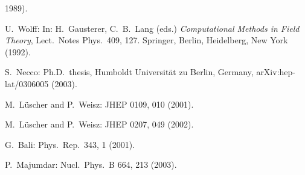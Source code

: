 \begin{enumerate}[label={[\arabic*]}]
        1989).
  \item U.~Wolff: In: H.~Gausterer, C.~B.~Lang (eds.) \emph{Computational Methods
        in Field Theory}, Lect.~Notes Phys.~409, 127. Springer, Berlin,
        Heidelberg, New York (1992).
  \item S.~Necco: Ph.D.~thesis, Humboldt Universit\"at zu Berlin, Germany,
        arXiv:hep-lat/0306005 (2003).
  \item M.~L\"uscher and P.~Weisz: JHEP 0109, 010 (2001).
  \item M.~L\"uscher and P.~Weisz: JHEP 0207, 049 (2002).
  \item G.~Bali: Phys.~Rep.~343, 1 (2001).
  \item P.~Majumdar: Nucl.~Phys.~B 664, 213 (2003).
\end{enumerate}
